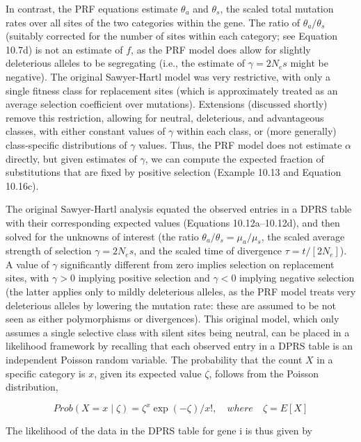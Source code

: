 \documentclass{article}
\begin{document}
In contrast, the PRF equations estimate  $ \theta_a $ and  $ \theta_s $, the scaled total mutation rates over all sites of the two categories within the gene. The ratio of  $ \theta_a/\theta_s $ (suitably corrected for the number of sites within each category; see Equation 10.7d) is not an estimate of  $ f $, as the PRF model does allow for slightly deleterious alleles to be segregating (i.e., the estimate of  $ \gamma = 2N_e s $ might be negative). The original Sawyer-Hartl model was very restrictive, with only a single fitness class for replacement sites (which is approximately treated as an average selection coefficient over mutations). Extensions (discussed shortly) remove this restriction, allowing for neutral, deleterious, and advantageous classes, with either constant values of  $ \gamma $ within each class, or (more generally) class-specific distributions of  $ \gamma $ values. Thus, the PRF model does not estimate  $ \alpha $ directly, but given estimates of  $ \gamma $, we can compute the expected fraction of substitutions that are fixed by positive selection (Example 10.13 and Equation 10.16c).

The original Sawyer-Hartl analysis equated the observed entries in a DPRS table with their corresponding expected values (Equations 10.12a–10.12d), and then solved for the unknowns of interest (the ratio  $ \theta_a/\theta_s = \mu_a/\mu_s $, the scaled average strength of selection  $ \gamma = 2N_e s $, and the scaled time of divergence  $ \tau = t/[2N_e] $). A value of  $ \gamma $ significantly different from zero implies selection on replacement sites, with  $ \gamma > 0 $ implying positive selection and  $ \gamma < 0 $ implying negative selection (the latter applies only to mildly deleterious alleles, as the PRF model treats very deleterious alleles by lowering the mutation rate: these are assumed to be not seen as either polymorphisms or divergences). This original model, which only assumes a single selective class with silent sites being neutral, can be placed in a likelihood framework by recalling that each observed entry in a DPRS table is an independent Poisson random variable. The probability that the count  $ X $ in a specific category is  $ x $, given its expected value  $ \zeta $, follows from the Poisson distribution,

\begin{equation}
Prob(X=x\mid\zeta)=\zeta^{x}\exp(-\zeta)/x!,\quad where\quad\zeta=E[X]
\end{equation}

The likelihood of the data in the DPRS table for gene i is thus given by
\end{document}
